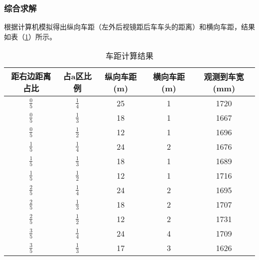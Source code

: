 \documentclass[withoutpreface,bwprint]{cumcmthesis} %
\begin{document}
\subsubsection{综合求解}

\par 根据计算机模拟得出纵向车距（左外后视镜距后车车头的距离）和横向车距，结果如表（\ref{车距计算结果}）所示。



\begin{table}[!h]
\centering
\caption{车距计算结果}
\label{车距计算结果}
    \begin{tabular}{|c|c|c|c|c|}
    \hline
    距右边距离占比                        & 占a区比例                        & 纵向车距(m) & 横向车距(m) & 观测到车宽(mm) \\ \hline
    $\frac{0}{5}$ & $\frac{1}{4}$ & 25   & 1    & 1720  \\ \hline
    $\frac{0}{5}$ & $\frac{1}{3}$ & 18   & 1    & 1667  \\ \hline
    $\frac{0}{5}$ & $\frac{1}{2}$ & 12   & 1    & 1696  \\ \hline
    $\frac{1}{5}$ & $\frac{1}{4}$ & 24   & 2   & 1676  \\ \hline
    $\frac{1}{5}$ & $\frac{1}{3}$ & 18   & 1    & 1689  \\ \hline
    $\frac{1}{5}$ & $\frac{1}{2}$ & 12   & 1    & 1716  \\ \hline
    $\frac{2}{5}$ & $\frac{1}{4}$ & 24   & 2    & 1695  \\ \hline
    $\frac{2}{5}$ & $\frac{1}{3}$ & 18   & 2    & 1707  \\ \hline
    $\frac{2}{5}$ & $\frac{1}{2}$ & 12   & 2    & 1731  \\ \hline
    $\frac{3}{5}$ & $\frac{1}{4}$ & 24   & 4    & 1709  \\ \hline
   	$\frac{3}{5}$ & $\frac{1}{3}$ & 17   & 3    & 1626  \\ \hline
    \end{tabular}
\end{table}
\end{document}
